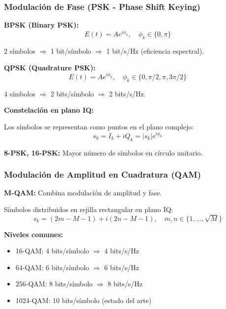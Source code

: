 \documentclass[11pt,a4paper]{article}
\begin{document}
\subsubsection{Modulación de Fase (PSK - Phase Shift Keying)}

\textbf{BPSK (Binary PSK):}
\begin{equation}
    E(t) = A e^{i\phi_k}, \quad \phi_k \in \{0, \pi\}
\end{equation}

2 símbolos $\Rightarrow$ 1 bit/símbolo $\Rightarrow$ 1 bit/s/Hz (eficiencia espectral).

\textbf{QPSK (Quadrature PSK):}
\begin{equation}
    E(t) = A e^{i\phi_k}, \quad \phi_k \in \{0, \pi/2, \pi, 3\pi/2\}
\end{equation}

4 símbolos $\Rightarrow$ 2 bits/símbolo $\Rightarrow$ 2 bits/s/Hz.

\textbf{Constelación en plano IQ:}

Los símbolos se representan como puntos en el plano complejo:
\begin{equation}
    s_k = I_k + iQ_k = |s_k|e^{i\phi_k}
\end{equation}

\textbf{8-PSK, 16-PSK:} Mayor número de símbolos en círculo unitario.

\subsubsection{Modulación de Amplitud en Cuadratura (QAM)}

\textbf{M-QAM:} Combina modulación de amplitud y fase.

Símbolos distribuidos en rejilla rectangular en plano IQ:
\begin{equation}
    s_k = (2m - M - 1) + i(2n - M - 1), \quad m,n \in \{1, \ldots, \sqrt{M}\}
\end{equation}

\textbf{Niveles comunes:}
\begin{itemize}
    \item 16-QAM: 4 bits/símbolo $\Rightarrow$ 4 bits/s/Hz
    \item 64-QAM: 6 bits/símbolo $\Rightarrow$ 6 bits/s/Hz
    \item 256-QAM: 8 bits/símbolo $\Rightarrow$ 8 bits/s/Hz
    \item 1024-QAM: 10 bits/símbolo (estado del arte)
\end{itemize}
\end{document}
